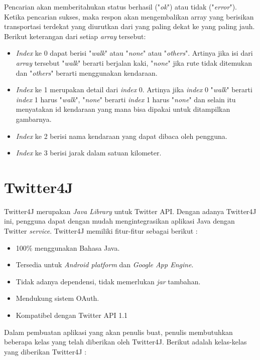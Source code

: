 Pencarian akan memberitahukan status berhasil ("\textit{ok}") atau tidak ("\textit{error}"). Ketika pencarian sukses, maka respon akan mengembalikan array yang berisikan transportasi terdekat yang diurutkan dari yang paling dekat ke yang paling jauh. Berikut keterangan dari setiap \textit{array} tersebut: 
\begin{itemize}
	\item \textit{Index} ke 0 dapat berisi "\textit{walk}" atau "\textit{none}" atau "\textit{others}". Artinya  jika isi dari \textit{array} tersebut "\textit{walk}" berarti berjalan kaki, "\textit{none}" jika rute tidak ditemukan dan "\textit{others}" berarti menggunakan kendaraan.
	\item \textit{Index} ke 1 merupakan detail dari \textit{index} 0. Artinya jika \textit{index} 0 "\textit{walk}" berarti \textit{index} 1 harus "\textit{walk}", "\textit{none}" berarti \textit{index} 1 harus "\textit{none}" dan selain itu menyatakan id kendaraan yang mana bisa dipakai untuk ditampilkan gambarnya.
	\item \textit{Index} ke 2 berisi nama kendaraan yang dapat dibaca oleh pengguna.
	\item \textit{Index} ke 3 berisi jarak dalam satuan kilometer.
\end{itemize}

\section{Twitter4J\cite{Twitter4J}}
Twitter4J merupakan \textit{Java Library} untuk Twitter API. Dengan adanya Twitter4J ini, pengguna dapat dengan mudah mengintegrasikan aplikasi Java dengan Twitter \textit{service}. Twitter4J memiliki fitur-fitur sebagai berikut :

\begin{itemize}
	\item 100\% menggunakan Bahasa Java.
	\item Tersedia untuk \textit{Android platform} dan \textit{Google App Engine}.
	\item Tidak adanya dependensi, tidak memerlukan \textit{jar} tambahan.
	\item Mendukung sistem OAuth.
	\item Kompatibel dengan Twitter API 1.1
\end{itemize}

Dalam pembuatan aplikasi yang akan penulis buat, penulis membutuhkan beberapa kelas yang telah diberikan oleh Twitter4J. Berikut adalah kelas-kelas yang diberikan Twitter4J :

